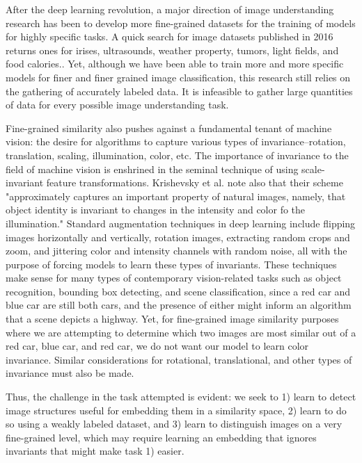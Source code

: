After the deep learning revolution, a major direction of image understanding research has been to develop more fine-grained datasets for the training of models for highly specific tasks. A quick search for image datasets published in 2016 returns ones for irises, ultrasounds, weather property, tumors, light fields, and food calories.\cite{bowyer2016nd}\cite{cortes2016ultrasound}\cite{chu2016image2weather}\cite{shi2016stacked}\cite{paudyal2016smart}\cite{pouladzadeh2015foodd}. Yet, although we have been able to train more and more specific models for finer and finer grained image classification, this research still relies on the gathering of accurately labeled data. It is infeasible to gather large quantities of data for every possible image understanding task.

Fine-grained similarity also pushes against a fundamental tenant of machine vision: the desire for algorithms to capture various types of invariance--rotation, translation, scaling, illumination, color, etc. The importance of invariance to the field of machine vision is enshrined in the seminal technique of using scale-invariant feature transformations. Krishevsky et al. note also that their scheme "approximately captures an important property of natural images, namely, that object identity is invariant to changes in the intensity and color fo the illumination."\cite{krizhevsky2012imagenet} Standard augmentation techniques in deep learning include flipping images horizontally and vertically, rotation images, extracting random crops and zoom, and jittering color and intensity channels with random noise, all with the purpose of forcing models to learn these types of invariants. These techniques make sense for many types of contemporary vision-related tasks such as object recognition, bounding box detecting, and scene classification, since a red car and blue car are still both cars, and the presence of either might inform an algorithm that a scene depicts a highway. Yet, for fine-grained image similarity purposes where we are attempting to determine which two images are most similar out of a red car, blue car, and red car, we do not want our model to learn color invariance. Similar considerations for rotational, translational, and other types of invariance must also be made.

Thus, the challenge in the task attempted is evident: we seek to 1) learn to detect image structures useful for embedding them in a similarity space, 2) learn to do so using a weakly labeled dataset, and 3) learn to distinguish images on a very fine-grained level, which may require learning an embedding that ignores invariants that might make task 1) easier.

